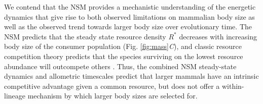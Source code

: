 \documentclass{pnastwo}
\begin{document}
\begin{article}
{%



We contend that the NSM provides a mechanistic understanding of the energetic dynamics that give rise to both observed limitations on mammalian body size as well as the observed trend towards larger body size over evolutionary time.
The NSM predicts that the steady state resource density $R^{*}$ decreases with increasing body size of the consumer population (Fig. \ref{fig:mass}\emph{C}), and classic resource competition theory predicts that the species surviving on the lowest resource abundance will outcompete others \cite{tilman1981,dutkiewicz2009,barton2010}. Thus, the combined NSM steady-state dynamics and allometric timescales predict that larger mammals have an intrinsic competitive advantage given a common resource, but does not offer a within-lineage mechanism by which larger body sizes are selected for.

}
\end{article}
\end{document}
